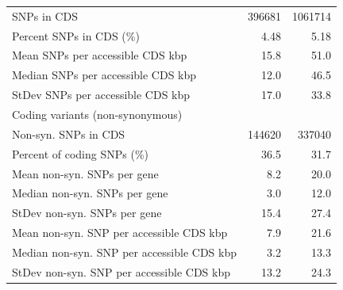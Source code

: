 \begin{table}[ht]
\begin{tabular}{lrr}
        \midrule
        SNPs in CDS                           & \num{396681}    & \num{1061714} \\
        Percent SNPs in CDS (\%)              & 4.48            & 5.18 \\
        Mean SNPs per accessible CDS kbp      & 15.8            & 51.0 \\
        Median SNPs per accessible CDS kbp    & 12.0            & 46.5 \\
        StDev SNPs per accessible CDS kbp     & 17.0            & 33.8 \\
        \midrule
            \rowcolor{white}Coding variants (non-synonymous) \\
        \midrule
        Non-syn. SNPs in CDS                  & \num{144620}    & \num{337040} \\
        Percent of coding SNPs (\%)           & 36.5            & 31.7 \\
        Mean non-syn. SNPs per gene           & 8.2             & 20.0 \\
        Median non-syn. SNPs per gene         & 3.0             & 12.0 \\
        StDev non-syn. SNPs per gene          & 15.4            & 27.4 \\
        Mean non-syn. SNP per accessible CDS kbp    & 7.9  & 21.6 \\
        Median non-syn. SNP per accessible CDS kbp  & 3.2  & 13.3 \\
        StDev non-syn. SNP per accessible CDS kbp   & 13.2 & 24.3 \\
        \bottomrule
    \end{tabular}
\label{tab:sup_popgen_stats}
\end{table}

